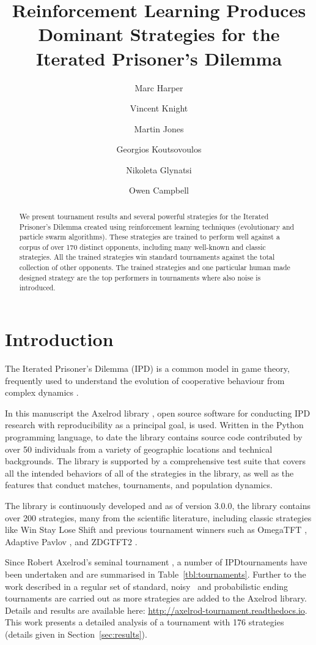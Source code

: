 \documentclass{article}
\title{Reinforcement Learning Produces Dominant Strategies for the
Iterated Prisoner's Dilemma}
\author{Marc Harper \and
        Vincent Knight \and
        Martin Jones \and
        Georgios Koutsovoulos \and
        Nikoleta Glynatsi \and
        Owen Campbell}
\date{}
\begin{document}
\maketitle

\begin{abstract}
    We present tournament results and several powerful strategies for the Iterated
    Prisoner's Dilemma created using reinforcement learning techniques
    (evolutionary and particle swarm algorithms). These strategies are
    trained to perform well against a corpus of over 170 distinct
    opponents, including many well-known and classic strategies. All
    the trained strategies win standard tournaments against the total collection
    of other opponents. The trained strategies and one particular human made
    designed strategy are the top performers in tournaments where also noise is introduced.
\end{abstract}

\section{Introduction}\label{sec:introduction}

The Iterated Prisoner's Dilemma (IPD) is a common model in game theory,
frequently used  to understand the evolution of cooperative behaviour from complex
dynamics \cite{Axelrod1984}.

In this manuscript the Axelrod library \cite{knight2016open, axelrodproject},
open source software for conducting IPD research with
reproducibility as a principal goal, is used. Written in the Python programming language,
to date the library contains source code contributed by over 50 individuals
from a variety of geographic locations and technical backgrounds. The library
is supported by a comprehensive test suite that covers all the intended
behaviors of all of the strategies in the library, as well as the features that
conduct matches, tournaments, and population dynamics.

The library is continuously developed and as of version 3.0.0, the library
contains over 200 strategies, many from the scientific literature, including
classic strategies like Win Stay Lose Shift \cite{nowak1993strategy} and
previous tournament winners such as OmegaTFT \cite{slany2007some}, Adaptive
Pavlov \cite{li2007design}, and ZDGTFT2 \cite{Stewart2012}.

Since Robert Axelrod's seminal tournament \cite{Axelrod1980a}, a number of
IPD\@ tournaments have been undertaken and are summarised in
Table~\ref{tbl:tournaments}. Further to the work described in
\cite{knight2016open} a regular set of standard, noisy~\cite{Bendor1991} and 
probabilistic ending~\cite{Axelrod1980b} tournaments are carried out as more 
strategies are added to the Axelrod library.
Details and results are available here:
\url{http://axelrod-tournament.readthedocs.io}. This work presents a detailed
analysis of a tournament with 176 strategies (details given
in Section~\ref{sec:results}).
\end{document}
